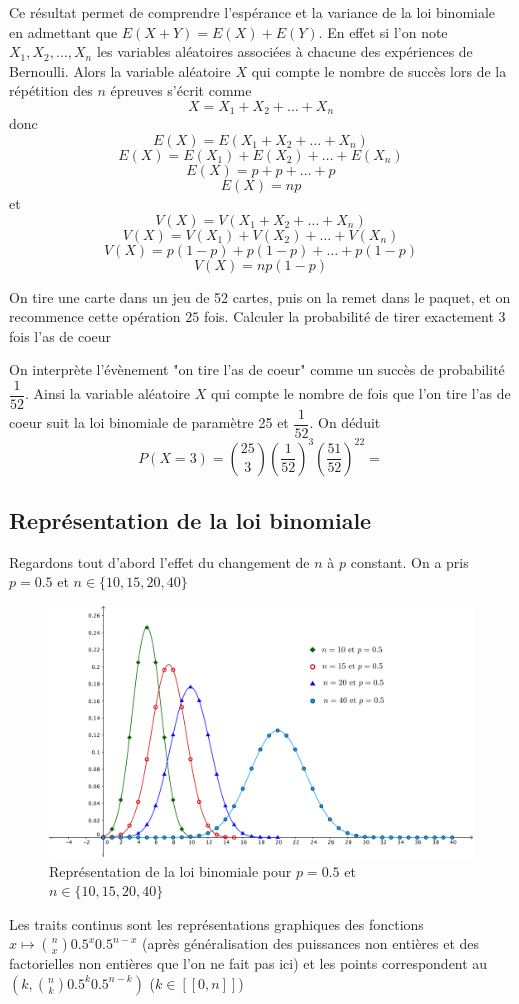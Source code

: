 Ce résultat permet de comprendre l'espérance et la variance de la loi binomiale en admettant que $E(X+Y) = E(X)+E(Y)$. En effet si l'on note $X_1,X_2,\ldots,X_n$ les variables aléatoires associées à chacune des expériences de Bernoulli. Alors la variable aléatoire $X$ qui compte le nombre de succès lors de la répétition des $n$ épreuves s'écrit comme 
$$X = X_1 + X_2 + \ldots + X_n$$
donc 
$$E(X) = E(X_1 + X_2 + \ldots + X_n)$$
$$E(X) = E(X_1) + E(X_2) + \ldots + E(X_n)$$
$$E(X) = p + p +\ldots + p$$
$$E(X) = np$$
et
$$V(X) = V(X_1 + X_2 + \ldots + X_n)$$
$$V(X) = V(X_1) + V(X_2) + \ldots + V(X_n)$$
$$V(X) = p(1-p) + p(1-p) +\ldots + p(1-p)$$
$$V(X) = np(1-p)$$
\begin{exemple}
On tire une carte dans un jeu de 52 cartes, puis on la remet dans le paquet, et on recommence cette opération $25$ fois. Calculer la probabilité de tirer exactement $3$ fois l'as de coeur\newline

On interprète l'évènement "on tire l'as de coeur" comme un succès de probabilité $\dfrac{1}{52}$. Ainsi la variable aléatoire $X$ qui compte le nombre de fois que l'on tire l'as de coeur suit la loi binomiale de paramètre 25 et $\dfrac{1}{52}$. On déduit 
$$P(X=3) = \binom{25}{3}\left(\dfrac{1}{52}\right)^3\left(\dfrac{51}{52}\right)^{22} = $$
\end{exemple}
\subsection{Représentation de la loi binomiale}
Regardons tout d'abord l'effet du changement de $n$ à $p$ constant. On a pris $p = 0.5$ et $n \in \{10,15,20,40\}$
\begin{figure}[H]
\centering
\includegraphics[scale=0.35]{images/loi_binomiale_1.png}
\caption{Représentation de la loi binomiale pour $p = 0.5$ et $n \in \{10,15,20,40\}$}
\end{figure}
Les traits continus sont les représentations graphiques des fonctions $x\mapsto \binom{n}{x} 0.5^x 0.5^{n-x}$ (après généralisation des puissances non entières et des factorielles non entières que l'on ne fait pas ici) et les points correspondent au $(k,\binom{n}{k} 0.5^k 0.5^{n-k})$ ($k\in [\![0,n]\!]$)\newline

